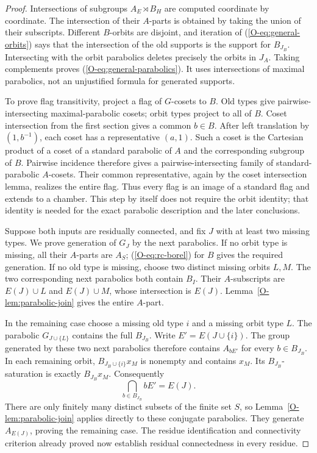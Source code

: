 \begin{proof}
Intersections of subgroups $A_E\rtimes B_H$ are computed coordinate by
coordinate. The intersection of their $A$-parts is obtained by taking
the union of their subscripts. Different $B$-orbits are disjoint, and
iteration of (\ref{O-eq:general-orbits}) says that the intersection of
the old supports is the support for $B_{J_B}$. Intersecting with the
orbit parabolics deletes precisely the orbits in $J_A$. Taking
complements proves (\ref{O-eq:general-parabolics}). It uses intersections
of maximal parabolics, not an unjustified formula for generated supports.

To prove flag transitivity, project a flag of $G$-cosets to $B$.
Old types give pairwise-intersecting maximal-parabolic cosets; orbit
types project to all of $B$. Coset intersection from the first section
gives a common $b\in B$. After left translation by $(1,b^{-1})$,
each coset has a representative $(a,1)$. Such a coset is the Cartesian
product of a coset of a standard parabolic of $A$ and the corresponding
subgroup of $B$. Pairwise incidence therefore gives a pairwise-intersecting
family of standard-parabolic $A$-cosets. Their common representative,
again by the coset intersection lemma, realizes the entire flag.
Thus every flag is an image of a standard flag and extends to a chamber.
This step by itself does not require the orbit identity; that identity
is needed for the exact parabolic description and the later conclusions.

Suppose both inputs are residually connected, and fix $J$ with at
least two missing types. We prove generation of $G_J$ by the next
parabolics. If no orbit type is missing, all their $A$-parts are $A_S$;
(\ref{O-eq:rc-borel}) for $B$ gives the required generation. If no old
type is missing, choose two distinct missing orbits $L,M$. The two
corresponding next parabolics both contain $B_I$. Their $A$-subscripts
are $E(J)\cup L$ and $E(J)\cup M$, whose intersection is $E(J)$.
Lemma~\ref{O-lem:parabolic-join} gives the entire $A$-part.

In the remaining case choose a missing old type $i$ and a missing
orbit type $L$. The parabolic $G_{J\cup\{L\}}$ contains the full
$B_{J_B}$. Write $E'=E(J\cup\{i\})$. The group generated by these
two next parabolics therefore contains $A_{bE'}$ for every
$b\in B_{J_B}$. In each remaining orbit, $B_{J_B\cup\{i\}}x_M$
is nonempty and contains $x_M$. Its $B_{J_B}$-saturation is exactly
$B_{J_B}x_M$. Consequently
\[
 \bigcap_{b\in B_{J_B}}bE'=E(J).
\]
There are only finitely many distinct subsets of the finite set $S$,
so Lemma~\ref{O-lem:parabolic-join} applies directly to these conjugate
parabolics. They generate $A_{E(J)}$, proving the remaining case.
The residue identification and connectivity criterion already proved
now establish residual connectedness in every residue.


\end{proof}
